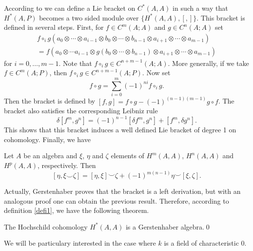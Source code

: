 \documentclass[TFM.tex]{subfiles}
\begin{document}
%

According to \cite[Theorem 4 of ]{Gerstenhaber} we can define a Lie bracket on $C^*(A,A)$ in such a way that $H^*(A,P)$ becomes a two sided module over $\{H^*(A,A),[,]\}$. This bracket is defined in several steps. First, for $f\in C^m(A;A)$ and $g\in C^n(A;A)$ set
\begin{gather*}
f\circ_i g(a_0\otimes\cdots\otimes a_{i-1}\otimes b_0\otimes\cdots\otimes b_{n-1}\otimes a_{i+1}\otimes\cdots \otimes a_{m-1})\\
=f(a_0\otimes \cdots a_{i-1}\otimes g(b_0\otimes\cdots\otimes b_{n-1})\otimes a_{i+1}\otimes\cdots\otimes a_{m-1})
\end{gather*}
for $i=0,\dots, m-1$. Note that $f\circ_i g\in C^{n+m-1}(A;A)$. More generally, if we take $f\in C^m(A;P)$, then $f\circ_ig\in C^{n+m-1}(A;P)$. Now set
\[
f\circ g=\sum_{i=0}^m (-1)^{ni}f\circ_i g.
\]
Then the bracket is defined by $[f,g]=f\circ g-(-1)^{(n-1)(m-1)}g\circ f$. The bracket also satisfies the corresponding Leibniz rule
\[\delta[f^m,g^n]=(-1)^{n-1}[\delta f^m,g^n]+[f^m,\delta g^n].\] This shows that this bracket induces a well defined Lie bracket of degree 1 on cohomology. Finally, we have

\begin{thm}\cite[Corollary 2 of ]{Gerstenhaber}
Let $A$ be an algebra and $\xi$, $\eta$ and $\zeta$ elements of $H^m(A,A)$, $H^n(A,A)$ and $H^p(A,A)$, respectively. Then
\[
[\eta, \xi\smile \zeta]=[\eta,\xi]\smile \zeta+(-1)^{m(n-1)}\eta\smile[\xi,\zeta].
\]
\end{thm}

Actually, Gerstenhaber proves that the bracket is a left derivation, but with an analogous proof one can obtain the previous result. Therefore, according to definition \ref{defi1}, we have the following theorem.

\begin{thm}
	The Hochschild cohomology $H^*(A,A)$ is a Gerstenhaber algebra.\qed
	\end{thm} 

We will be particulary interested in the case where $k$ is a field of characteristic 0.
\end{document}

